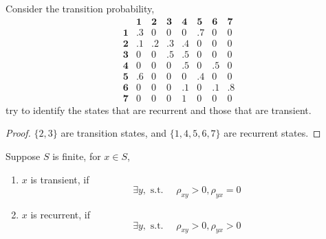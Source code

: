 \begin{example}
    Consider the transition probability,
    \begin{equation*}
        \begin{array}{cccccccc}
                       & \mathbf{1} & \mathbf{2} & \mathbf{3} & \mathbf{4} & \mathbf{5} & \mathbf{6} & \mathbf{7} \\
            \mathbf{1} & .3         & 0          & 0          & 0          & .7         & 0          & 0          \\
            \mathbf{2} & .1         & .2         & .3         & .4         & 0          & 0          & 0          \\
            \mathbf{3} & 0          & 0          & .5         & .5         & 0          & 0          & 0          \\
            \mathbf{4} & 0          & 0          & 0          & .5         & 0          & .5         & 0          \\
            \mathbf{5} & .6         & 0          & 0          & 0          & .4         & 0          & 0          \\
            \mathbf{6} & 0          & 0          & 0          & .1         & 0          & .1         & .8         \\
            \mathbf{7} & 0          & 0          & 0          & 1          & 0          & 0          & 0
        \end{array}
    \end{equation*}
    try to identify the states that are recurrent and those that are transient.
\end{example}

\begin{proof}
    $\{2,3\}$ are transition states, and $\{1,4,5,6,7\}$ are recurrent states.
\end{proof}

\begin{remark}
    Suppose $S$ is finite, for $x\in S$,
    \begin{enumerate}
        \item $x$ is transient, if
              \begin{equation*}
                  \exists y,\text{ s.t. }\quad\rho_{xy}>0,\rho_{yx}=0
              \end{equation*}
        \item $x$ is recurrent, if
              \begin{equation*}
                  \exists y,\text{ s.t. }\quad\rho_{xy}>0,\rho_{yx}>0
              \end{equation*}
    \end{enumerate}
\end{remark}

